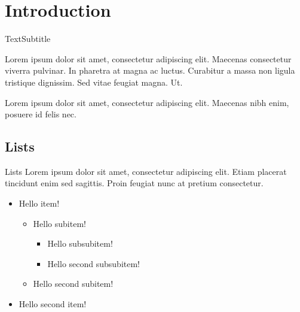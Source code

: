 \documentclass[aspectratio=169]{beamer}
\begin{document}


\section{Introduction}
\begin{frame}{Text}{Subtitle}


    Lorem ipsum dolor sit amet, consectetur adipiscing elit. Maecenas consectetur viverra pulvinar. In pharetra at magna ac luctus. Curabitur a massa non ligula tristique dignissim. Sed vitae feugiat magna. Ut.

    Lorem ipsum dolor sit amet, consectetur adipiscing elit. Maecenas nibh enim, posuere id felis nec.
\end{frame}







\subsection{Lists}

\begin{frame}{Lists}
    Lorem ipsum dolor sit amet, consectetur adipiscing elit. Etiam placerat tincidunt enim sed sagittis. Proin feugiat nunc at pretium consectetur.
    \begin{itemize}
        \item Hello item!
        \begin{itemize}
            \item Hello subitem!
            \begin{itemize}
                \item Hello subsubitem!
                \item Hello second subsubitem!
            \end{itemize}
            \item Hello second subitem!
        \end{itemize}
        \item Hello second item!
    \end{itemize}
\end{frame}
\end{document}
